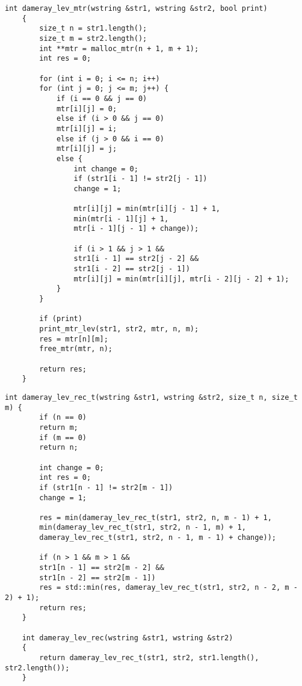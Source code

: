 \begin{lstlisting}[label=lst:dameray_lev_rec,caption=Функция нахождения расстояния Дамерау-Левенштейна с использованием матрицы]
	int dameray_lev_mtr(wstring &str1, wstring &str2, bool print)
	{
		size_t n = str1.length();
		size_t m = str2.length();
		int **mtr = malloc_mtr(n + 1, m + 1);
		int res = 0;
		
		for (int i = 0; i <= n; i++)
		for (int j = 0; j <= m; j++) {
			if (i == 0 && j == 0)
			mtr[i][j] = 0;
			else if (i > 0 && j == 0)
			mtr[i][j] = i;
			else if (j > 0 && i == 0)
			mtr[i][j] = j;
			else {
				int change = 0;
				if (str1[i - 1] != str2[j - 1])
				change = 1;
				
				mtr[i][j] = min(mtr[i][j - 1] + 1,
				min(mtr[i - 1][j] + 1,
				mtr[i - 1][j - 1] + change));
				
				if (i > 1 && j > 1 &&
				str1[i - 1] == str2[j - 2] &&
				str1[i - 2] == str2[j - 1])
				mtr[i][j] = min(mtr[i][j], mtr[i - 2][j - 2] + 1);
			}
		}
		
		if (print)
		print_mtr_lev(str1, str2, mtr, n, m);
		res = mtr[n][m];
		free_mtr(mtr, n);
		
		return res;
	}
\end{lstlisting}

\clearpage

\begin{lstlisting}[label=lst:dameray_lev_mtr,caption=Функция нахождения расстояния Дамерау-Левенштейна рекурсивно]
	int dameray_lev_rec_t(wstring &str1, wstring &str2, size_t n, size_t m) {
		if (n == 0)
		return m;
		if (m == 0)
		return n;
		
		int change = 0;
		int res = 0;
		if (str1[n - 1] != str2[m - 1])
		change = 1;
		
		res = min(dameray_lev_rec_t(str1, str2, n, m - 1) + 1,
		min(dameray_lev_rec_t(str1, str2, n - 1, m) + 1,
		dameray_lev_rec_t(str1, str2, n - 1, m - 1) + change));
		
		if (n > 1 && m > 1 &&
		str1[n - 1] == str2[m - 2] &&
		str1[n - 2] == str2[m - 1])
		res = std::min(res, dameray_lev_rec_t(str1, str2, n - 2, m - 2) + 1);
		return res;
	}
	
	int dameray_lev_rec(wstring &str1, wstring &str2)
	{
		return dameray_lev_rec_t(str1, str2, str1.length(), str2.length());
	}
\end{lstlisting}

\clearpage

